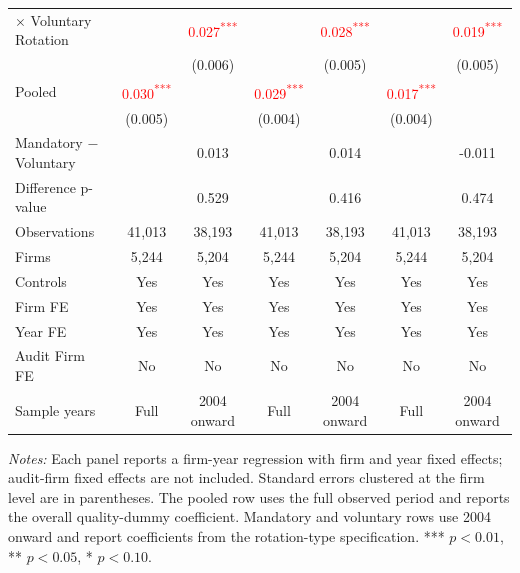 \documentclass[10pt]{article}
\newcommand{\sym}[1]{\textsuperscript{#1}}
\begin{document}
\begin{minipage}{19cm}
\begin{threeparttable}
\begin{tabular}{l cc cc cc}
$\times$ Voluntary Rotation &  & \textcolor{red}{0.027\sym{***}} &  & \textcolor{red}{0.028\sym{***}} &  & \textcolor{red}{0.019\sym{***}} \\
 &  & (0.006) &  & (0.005) &  & (0.005) \\
Pooled & \textcolor{red}{0.030\sym{***}} &  & \textcolor{red}{0.029\sym{***}} &  & \textcolor{red}{0.017\sym{***}} &  \\
 & (0.005) &  & (0.004) &  & (0.004) &  \\
Mandatory $-$ Voluntary &  & 0.013 &  & 0.014 &  & -0.011 \\
Difference p-value &  & 0.529 &  & 0.416 &  & 0.474 \\
Observations & 41,013 & 38,193 & 41,013 & 38,193 & 41,013 & 38,193 \\
Firms & 5,244 & 5,204 & 5,244 & 5,204 & 5,244 & 5,204 \\
\midrule
Controls & Yes & Yes & Yes & Yes & Yes & Yes \\
Firm FE & Yes & Yes & Yes & Yes & Yes & Yes \\
Year FE & Yes & Yes & Yes & Yes & Yes & Yes \\
Audit Firm FE & No & No & No & No & No & No \\
Sample years & Full & 2004 onward & Full & 2004 onward & Full & 2004 onward \\
\bottomrule
\end{tabular}
\begin{tablenotes}\fontsize{9}{11}\selectfont
\item \fontsize{9}{11}\selectfont \textit{Notes:} Each panel reports a firm-year regression with firm and year fixed effects; audit-firm fixed effects are not included. Standard errors clustered at the firm level are in parentheses. The pooled row uses the full observed period and reports the overall quality-dummy coefficient. Mandatory and voluntary rows use 2004 onward and report coefficients from the rotation-type specification. *** \(p<0.01\), ** \(p<0.05\), * \(p<0.10\).
\end{tablenotes}
\end{threeparttable}

\end{minipage}
\end{document}
